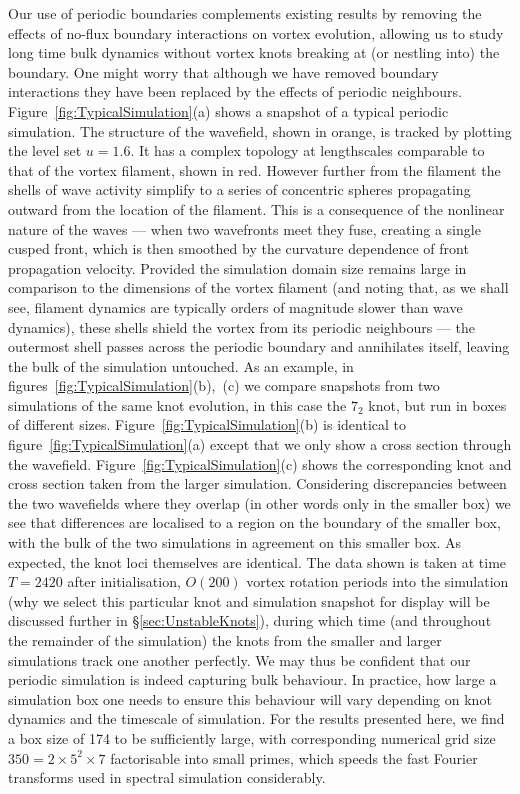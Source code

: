 Our use of periodic boundaries complements existing results by removing the effects of no-flux boundary interactions on vortex evolution, allowing us to study long time bulk dynamics without vortex knots breaking at (or nestling into) the boundary. One might worry that although we have removed boundary interactions they have been replaced by the effects of periodic neighbours. Figure~\ref{fig:TypicalSimulation}(a) shows a snapshot of a typical periodic simulation. The structure of the wavefield, shown in orange, is tracked by plotting the level set $u=1.6$. It has a complex topology at lengthscales comparable to that of the vortex filament, shown in red. However further from the filament the shells of wave activity simplify to a series of concentric spheres propagating outward from the location of the filament. This is a consequence of the nonlinear nature of the waves --- when two wavefronts meet they fuse, creating a single cusped front, which is then smoothed by the curvature dependence of front propagation velocity. Provided the simulation domain size remains large in comparison to the dimensions of the vortex filament (and noting that, as we shall see, filament dynamics are typically orders of magnitude slower than wave dynamics), these shells shield the vortex from its periodic neighbours --- the outermost shell passes across the periodic boundary and annihilates itself, leaving the bulk of the simulation untouched. As an example, in figures~\ref{fig:TypicalSimulation}(b),~(c) we compare snapshots from two simulations of the same knot evolution, in this case the $7_2$ knot, but run in boxes of different sizes. Figure~\ref{fig:TypicalSimulation}(b) is identical to figure~\ref{fig:TypicalSimulation}(a) except that we only show a cross section through the wavefield. Figure~\ref{fig:TypicalSimulation}(c) shows the corresponding knot and cross section taken from the larger simulation. Considering discrepancies between the two wavefields where they overlap (in other words only in the smaller box) we see that differences are localised to a region on the boundary of the smaller box, with the bulk of the two simulations in agreement on this smaller box. As expected, the knot loci themselves are identical. The data shown is taken at time $T=2420$ after initialisation, $O(200)$ vortex rotation periods into the simulation (why we select this particular knot and simulation snapshot for display will be discussed further in \S\ref{sec:UnstableKnots}), during which time (and throughout the remainder of the simulation) the knots from the smaller and larger simulations track one another perfectly. We may thus be confident that our periodic simulation is indeed capturing bulk behaviour. In practice, how large a simulation box one needs to ensure this behaviour will vary depending on knot dynamics and the timescale of simulation. For the results presented here, we find a box size of 174 to be sufficiently large, with corresponding numerical grid size
$350 = 2\times5^2\times7$ factorisable into small primes, which speeds the fast Fourier transforms used in spectral simulation considerably.

